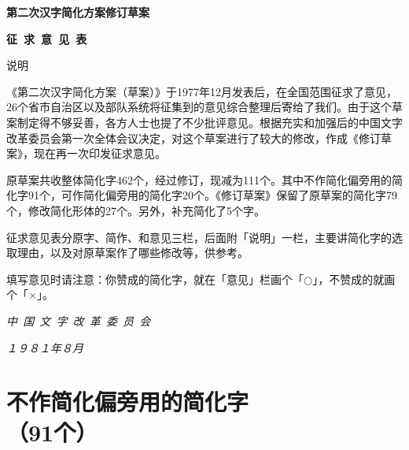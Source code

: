 \documentclass[12pt, fontset=none, UTF8, AutoFakeBold]{ctexbook}
\newcommand{\raisesymbol}[1]{\raise1.3pt\hbox{#1}}
\begin{document}
\begin{titlepage}
    \begin{center}
        \huge
        \vspace*{3cm}
        \textbf{第二次汉字简化方案修订草案}\par
        \textbf{征\ 求\ 意\ 见\ 表}\par
        \vspace*{2.5cm}
        \Large
        说\qquad{}明\par
    \end{center}

    《第二次汉字简化方案（草案）》于1977年12月发表后，在全国范围征求了意见，26个省市自治区以及部队系统将征集到的意见综合整理后寄给了我们。由于这个草案制定得不够妥善，各方人士也提了不少批评意见。根据充实和加强后的中国文字改革委员会第一次全体会议决定，对这个草案进行了较大的修改，作成《修订草案》，现在再一次印发征求意见。

    原草案共收整体简化字462个，经过修订，现减为111个。其中不作简化偏旁用的简化字91个，可作简化偏旁用的简化字20个。《修订草案》保留了原草案的简化字79个，修改简化形体的27个。另外，补充简化了5个字。

    征求意见表分原字、简作、和意见三栏，后面附「说明」一栏，主要讲简化字的选取理由，以及对原草案作了哪些修改等，供参考。

    填写意见时请注意：你赞成的简化字，就在「意见」栏画个「\raisesymbol{$\bigcirc$}」，不赞成的就画个「\raisesymbol{$\times$}」。

    \begin{center}
        \Large
        \vspace*{1.5cm}
        \textit{中\ 国\ 文\ 字\ 改\ 革\ 委\ 员\ 会}\par
        \textit{１９８１年８月}
    \end{center}
\end{titlepage}

\section{不作简化偏旁用的简化字\\（91个）}
\end{document}
